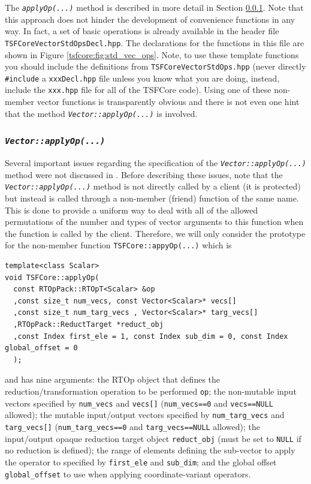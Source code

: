 The {}\texttt{\textit{applyOp(\-...)}}  method is described in more
detail in Section {}\ref{tsfcore:sec:vec_apply_op}.  Note that this
approach does not hinder the development of convenience functions in
any way.  In fact, a set of basic operations is already available in
the header file {}\texttt{TSFCore\-Vector\-Std\-Ops\-Decl.hpp}.  The
declarations for the functions in this file are shown in Figure
{}\ref{tsfcore:fig:std_vec_ops}.  Note, to use these template
functions you should include the definitions from
{}\texttt{TSFCore\-Vector\-Std\-Ops.hpp} (never directly
{}\texttt{\#include} a {}\texttt{xxxDecl.hpp} file unless you know
what you are doing, instead, include the {}\texttt{xxx.hpp} file for
all of the TSFCore code).  Using one of these non-member vector
functions is transparently obvious and there is not even one hint that
the method {}\texttt{\textit{Vector::applyOp(\-...)}} is involved.

%
\subsubsection{\texttt{\textit{Vector::applyOp(\-...)}}}
\label{tsfcore:sec:vec_apply_op}
%

Several important issues regarding the specification of the
{}\texttt{\textit{Vector::applyOp(\-...)}} method were not discussed
in {}\cite{ref:rtop_toms}.  Before describing these issues, note that
the {}\texttt{\textit{Vector\-::applyOp(\-...)}} method is not
directly called by a client (it is protected) but instead is called
through a non-member (friend) function of the same name.  This is done
to provide a uniform way to deal with all of the allowed permutations
of the number and types of vector arguments to this function when the
function is called by the client.  Therefore, we will only consider
the prototype for the non-member function
{}\texttt{TSFCore::appyOp(...)}  which is

{\scriptsize\begin{verbatim}
template<class Scalar>
void TSFCore::applyOp(
  const RTOpPack::RTOpT<Scalar> &op
  ,const size_t num_vecs, const Vector<Scalar>* vecs[]
  ,const size_t num_targ_vecs , Vector<Scalar>* targ_vecs[]
  ,RTOpPack::ReductTarget *reduct_obj
  ,const Index first_ele = 1, const Index sub_dim = 0, const Index global_offset = 0
  );
\end{verbatim}}

{}\noindent{}and has nine arguments: the RTOp object that defines the
reduction/transformation operation to be performed {}\texttt{op}; the
non-mutable input vectors specified by {}\texttt{num\_vecs} and
{}\texttt{vecs[]} (\texttt{num\_vecs==0} and {}\texttt{vecs==NULL}
allowed); the mutable input/output vectors specified by
{}\texttt{num\_targ\_vecs} and {}\texttt{targ\-\_vecs[]}
(\texttt{num\_targ\_vecs==0} and {}\texttt{targ\_vecs==NULL} allowed);
the input/output opaque reduction target object {}\texttt{reduct\_obj}
(must be set to {}\texttt{NULL} if no reduction is defined); the range
of elements defining the sub-vector to apply the operator to specified
by {}\texttt{first\_ele} and {}\texttt{sub\_dim}; and the global
offset {}\texttt{global\_offset} to use when applying
coordinate-variant operators.

